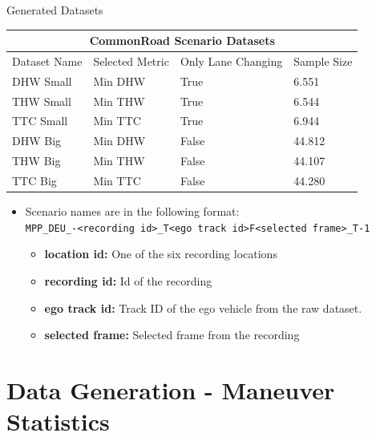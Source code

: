 \documentclass[shortpres]{beamer}
\begin{document}
\begin{frame}{Generated Datasets}	

\begin{tabular}{ |p{2.3cm}||p{2.5cm}|p{3.2cm}|p{2cm}|  }
 \hline
 \multicolumn{4}{|c|}{CommonRoad Scenario Datasets} \\
 \hline
 Dataset Name & Selected Metric & Only Lane Changing & Sample Size\\
 \hline
 DHW Small & Min DHW & True  & 6.551\\
 THW Small & Min THW & True  & 6.544\\
 TTC Small & Min TTC & True  & 6.944\\
 DHW Big   & Min DHW & False & 44.812\\
 THW Big   & Min THW & False & 44.107\\
 TTC Big   & Min TTC & False & 44.280\\
 \hline
\end{tabular}

\vfill

\begin{itemize} 
\item Scenario names are in the following format:\\
\fontsize{8pt}{15pt}\selectfont\texttt{MPP\_DEU\_<location id>-<recording id>\_T<ego track id>F<selected frame>\_T-1}
	\begin{itemize} 
	\fontsize{7pt}{10pt}\selectfont\item \textbf{location id:} One of the six recording locations
	\fontsize{7pt}{10pt}\selectfont\item \textbf{recording id:} Id of the recording
	\fontsize{7pt}{10pt}\selectfont\item \textbf{ego track id:} Track ID of the ego vehicle from the raw dataset.
	\fontsize{7pt}{10pt}\selectfont\item \textbf{selected frame:} Selected frame from the recording
	\end{itemize}
\end{itemize}

\end{frame}

\section{Data Generation - Maneuver Statistics}	
\end{document}
